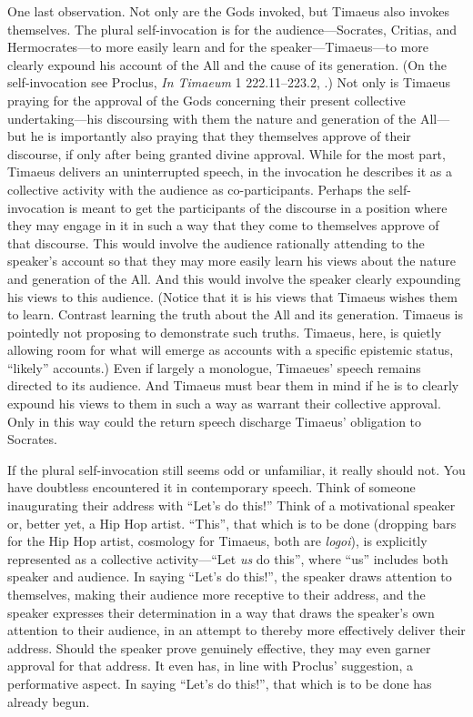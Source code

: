 One last observation. Not only are the Gods invoked, but Timaeus also invokes themselves. The plural self-invocation is for the audience---Socrates, Critias, and Herm\-ocrates---to more easily learn and for the speaker---Timaeus---to more clearly expound his account of the All and the cause of its generation. (On the self-invocation see Proclus, \emph{In Timaeum} 1 222.11--223.2, \citealt{Diehl:1903re}.) Not only is Timaeus praying for the approval of the Gods concerning their present collective undertaking---his discoursing with them the nature and generation of the All---but he is importantly also praying that they themselves approve of their discourse, if only after being granted divine approval. While for the most part, Timaeus delivers an uninterrupted speech, in the invocation he describes it as a collective activity with the audience as co-participants. Perhaps the self-invocation is meant to get the participants of the discourse in a position where they may engage in it in such a way that they come to themselves approve of that discourse. This would involve the audience rationally attending to the speaker's account so that they may more easily learn his views about the nature and generation of the All. And this would involve the speaker clearly expounding his views to this audience. (Notice that it is his views that Timaeus wishes them to learn. Contrast learning the truth about the All and its generation. Timaeus is pointedly not proposing to demonstrate such truths. Timaeus, here, is quietly allowing room for what will emerge as accounts with a specific epistemic status, ``likely'' accounts.) Even if largely a monologue, Timaeues' speech remains directed to its audience. And Timaeus must bear them in mind if he is to clearly expound his views to them in such a way as warrant their collective approval. Only in this way could the return speech discharge Timaeus' obligation to Socrates. 

If the plural self-invocation still seems odd or unfamiliar, it really should not. You have doubtless encountered it in contemporary speech. Think of someone inaugurating their address with ``Let's do this!'' Think of a motivational speaker or, better yet, a Hip Hop artist. ``This'', that which is to be done (dropping bars for the Hip Hop artist, cosmology for Timaeus, both are \emph{logoi}), is explicitly represented as a collective activity---``Let \emph{us} do this'', where ``us'' includes both speaker and audience. In saying ``Let's do this!'', the speaker draws attention to themselves, making their audience more receptive to their address, and the speaker expresses their determination in a way that draws the speaker's own attention to their audience, in an attempt to thereby more effectively deliver their address. Should the speaker prove genuinely effective, they may even garner approval for that address. It even has, in line with Proclus' suggestion, a performative aspect. In saying ``Let's do this!'', that which is to be done has already begun.

